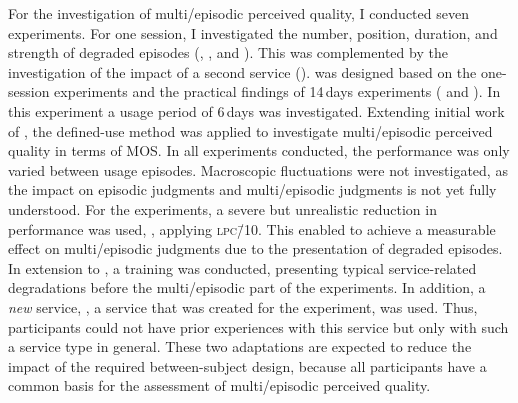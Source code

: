 For the investigation of multi\-/episodic perceived quality, I conducted seven experiments.
For one session, I investigated the number, position, duration, and strength of degraded episodes (, \EIIa{}, and ).
This was complemented by the investigation of the impact of a second service (\EIIb{}).
 was designed based on the one-session experiments and the practical findings of 14\,days experiments ( and ).
In this experiment a usage period of 6\,days was investigated.
Extending initial work of \citet{moller_single-call_2011}, the defined-use method was applied to investigate multi\-/episodic perceived quality in terms of \ac{MOS}.
In all experiments conducted, the performance was only varied between usage episodes.
Macroscopic fluctuations were not investigated, as the impact on episodic judgments and multi\-/episodic judgments is not yet fully understood.
For the experiments, a severe but unrealistic reduction in performance was used, \ie, applying \textsc{\lowercase{LPC\=/10}}.
This enabled to achieve a measurable effect on multi\-/episodic judgments due to the presentation of degraded episodes.
In extension to \citet{moller_single-call_2011}, a training was conducted, presenting typical service-related degradations before the multi\-/episodic part of the experiments.
In addition, a \emph{new} service, \ie, a service that was created for the experiment, was used.
Thus, participants could not have prior experiences with this service but only with such a service type in general.
These two adaptations are expected to reduce the impact of the required between-subject design, because all participants have a common basis for the assessment of multi\-/episodic perceived quality.

